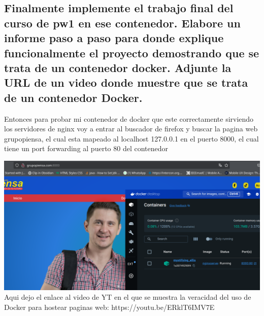 	\subsection{Finalmente implemente el trabajo final del curso de pw1 en ese contenedor. \newline
	Elabore un informe paso a paso para donde explique funcionalmente el proyecto demostrando  que se trata de un contenedor docker.\newline
	Adjunte la URL de un video donde muestre que se trata de un contenedor Docker. \newline}

	Entonces para probar mi contenedor de docker que este correctamente sirviendo los servidores de nginx voy a entrar al buscador de firefox 
	y buscar la pagina web grupopiensa, el cual esta mapeado al localhost 127.0.0.1 en el puerto 8000, el cual tiene un port forwarding
	al puerto 80 del contenedor

	\includegraphics[scale = 0.3]{./img/lab1_2.png}
	\newline
	Aqui dejo el enlace al video de YT en el que se muestra la veracidad del uso de Docker para hostear paginas web: https://youtu.be/ERklT6IMV7E

\pagebreak